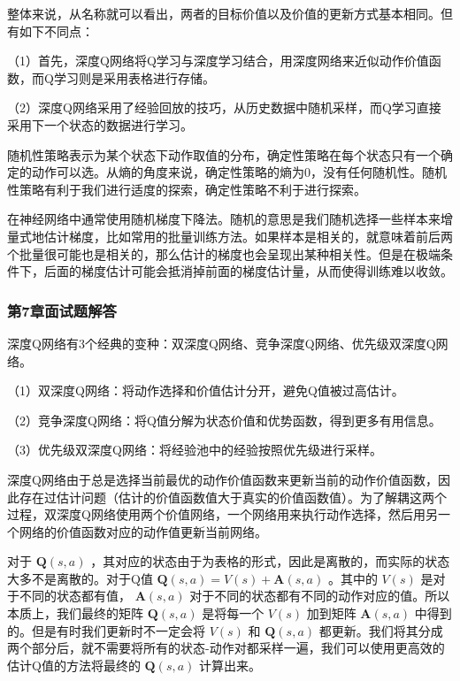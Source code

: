 
整体来说，从名称就可以看出，两者的目标价值以及价值的更新方式基本相同。但有如下不同点：

（1）首先，深度Q网络将Q学习与深度学习结合，用深度网络来近似动作价值函数，而Q学习则是采用表格进行存储。

（2）深度Q网络采用了经验回放的技巧，从历史数据中随机采样，而Q学习直接采用下一个状态的数据进行学习。


随机性策略表示为某个状态下动作取值的分布，确定性策略在每个状态只有一个确定的动作可以选。从熵的角度来说，确定性策略的熵为0，没有任何随机性。随机性策略有利于我们进行适度的探索，确定性策略不利于进行探索。


在神经网络中通常使用随机梯度下降法。随机的意思是我们随机选择一些样本来增量式地估计梯度，比如常用的批量训练方法。如果样本是相关的，就意味着前后两个批量很可能也是相关的，那么估计的梯度也会呈现出某种相关性。但是在极端条件下，后面的梯度估计可能会抵消掉前面的梯度估计量，从而使得训练难以收敛。



\subsubsection*{第7章面试题解答}


深度Q网络有3个经典的变种：双深度Q网络、竞争深度Q网络、优先级双深度Q网络。
  
（1）双深度Q网络：将动作选择和价值估计分开，避免Q值被过高估计。

（2）竞争深度Q网络：将Q值分解为状态价值和优势函数，得到更多有用信息。

（3）优先级双深度Q网络：将经验池中的经验按照优先级进行采样。


深度Q网络由于总是选择当前最优的动作价值函数来更新当前的动作价值函数，因此存在过估计问题（估计的价值函数值大于真实的价值函数值）。为了解耦这两个过程，双深度Q网络使用两个价值网络，一个网络用来执行动作选择，然后用另一个网络的价值函数对应的动作值更新当前网络。


对于 $\boldsymbol{Q}(s,a)$ ，其对应的状态由于为表格的形式，因此是离散的，而实际的状态大多不是离散的。对于Q值 $\boldsymbol{Q}(s,a)=V(s)+\boldsymbol{A}(s,a)$ 。其中的 $V(s)$ 是对于不同的状态都有值， $\boldsymbol{A}(s,a)$ 对于不同的状态都有不同的动作对应的值。所以本质上，我们最终的矩阵 $\boldsymbol{Q}(s,a)$ 是将每一个 $V(s)$ 加到矩阵 $\boldsymbol{A}(s,a)$ 中得到的。但是有时我们更新时不一定会将 $V(s)$ 和 $\boldsymbol{Q}(s,a)$ 都更新。我们将其分成两个部分后，就不需要将所有的状态-动作对都采样一遍，我们可以使用更高效的估计Q值的方法将最终的 $\boldsymbol{Q}(s,a)$ 计算出来。



